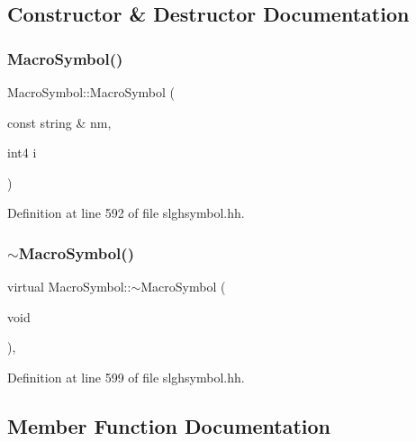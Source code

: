 \subsection{Constructor \& Destructor Documentation}
\mbox{\label{class_macro_symbol_a866aa0599e9e34c46b6692d50ae4d57e}} 
\subsubsection{\texorpdfstring{MacroSymbol()}{MacroSymbol()}}
{\footnotesize\ttfamily Macro\+Symbol\+::\+Macro\+Symbol (\begin{DoxyParamCaption}\item[{const string \&}]{nm,  }\item[{int4}]{i }\end{DoxyParamCaption})\hspace{0.3cm}{\ttfamily [inline]}}



Definition at line 592 of file slghsymbol.\+hh.

\mbox{\label{class_macro_symbol_af02af2bfeffa2a804f94910d04d36865}} 
\subsubsection{\texorpdfstring{$\sim$MacroSymbol()}{~MacroSymbol()}}
{\footnotesize\ttfamily virtual Macro\+Symbol\+::$\sim$\+Macro\+Symbol (\begin{DoxyParamCaption}\item[{void}]{ }\end{DoxyParamCaption})\hspace{0.3cm}{\ttfamily [inline]}, {\ttfamily [virtual]}}



Definition at line 599 of file slghsymbol.\+hh.



\subsection{Member Function Documentation}
\mbox{\label{class_macro_symbol_aeb8d11b7c982396faac11ebbc9654941}} 
